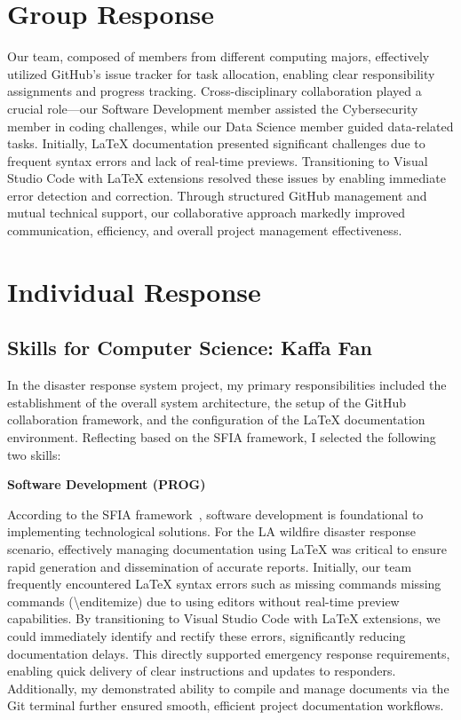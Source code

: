 \documentclass[a4paper, 11pt]{report}
\begin{document}

\tableofcontents

\newpage

\section{Group Response}

Our team, composed of members from different computing majors, effectively utilized GitHub's issue tracker for task allocation, enabling clear responsibility assignments and progress tracking. Cross-disciplinary collaboration played a crucial role—our Software Development member assisted the Cybersecurity member in coding challenges, while our Data Science member guided data-related tasks. Initially, LaTeX documentation presented significant challenges due to frequent syntax errors and lack of real-time previews. Transitioning to Visual Studio Code with LaTeX extensions resolved these issues by enabling immediate error detection and correction. Through structured GitHub management and mutual technical support, our collaborative approach markedly improved communication, efficiency, and overall project management effectiveness.


\newpage
\section{Individual Response}

\subsection{Skills for Computer Science: Kaffa Fan }
In the disaster response system project, my primary responsibilities included the establishment of the overall system architecture, the setup of the GitHub collaboration framework, and the configuration of the LaTeX documentation environment. Reflecting based on the SFIA framework, I selected the following two skills:

\textbf{Software Development (PROG)}

According to the SFIA framework~\cite{sfia}, software development is foundational to implementing technological solutions. For the LA wildfire disaster response scenario, effectively managing documentation using LaTeX was critical to ensure rapid generation and dissemination of accurate reports. Initially, our team frequently encountered LaTeX syntax errors such as missing commands missing commands (\textbackslash end{itemize})
 due to using editors without real-time preview capabilities. By transitioning to Visual Studio Code with LaTeX extensions, we could immediately identify and rectify these errors, significantly reducing documentation delays. This directly supported emergency response requirements, enabling quick delivery of clear instructions and updates to responders. Additionally, my demonstrated ability to compile and manage documents via the Git terminal further ensured smooth, efficient project documentation workflows.
\end{document}
